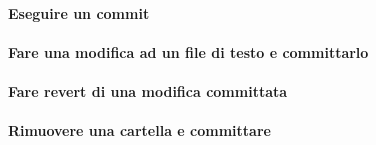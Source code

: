 \documentclass[a4paper]{article}
\begin{document}
		\paragraph{Eseguire un commit}
		
		\paragraph{Fare una modifica ad un file di testo e committarlo}
		
		\paragraph{Fare revert di una modifica committata}
		
		\paragraph{Rimuovere una cartella e committare}
		
		
	
\end{document}
